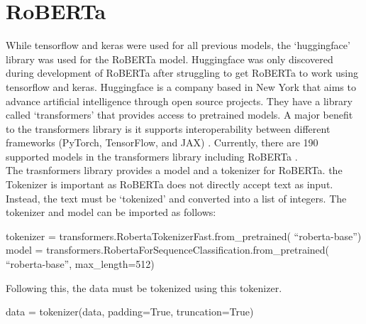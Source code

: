 \section{RoBERTa}
While tensorflow and keras were used for all previous models, the `huggingface' library was used for the RoBERTa model. Huggingface was only discovered
during development of RoBERTa after struggling to get RoBERTa to work using tensorflow and keras. Huggingface is a company based in New York that aims
to advance artificial intelligence through open source projects. They have a library called `transformers' \cite{transformers} that provides access
to pretrained models. A major benefit to the transformers library is it supports interoperability between different frameworks (PyTorch, TensorFlow, and JAX)
\cite{transformers}. Currently, there are 190 supported models in the transformers library including RoBERTa \cite{transformers}.\\
The trasnformers library provides a model and a tokenizer for RoBERTa. the Tokenizer is important as RoBERTa does not directly accept text as input. Instead,
the text must be `tokenized' and converted into a list of integers. The tokenizer and model can be imported as follows:
\begin{algorithm}
    \begin{algorithmic}
        \STATE tokenizer = transformers.RobertaTokenizerFast.from\_pretrained(
        \bindent
        \STATE ``roberta-base'')
        \eindent
        \STATE model = transformers.RobertaForSequenceClassification.from\_pretrained(
        \bindent
        \STATE    ``roberta-base'', max\_length=512)
        \eindent
    \end{algorithmic}
\end{algorithm}

Following this, the data must be tokenized using this tokenizer.
\begin{algorithm}
    \begin{algorithmic}
        \STATE data = tokenizer(data, padding=True, truncation=True)
    \end{algorithmic}
\end{algorithm}

